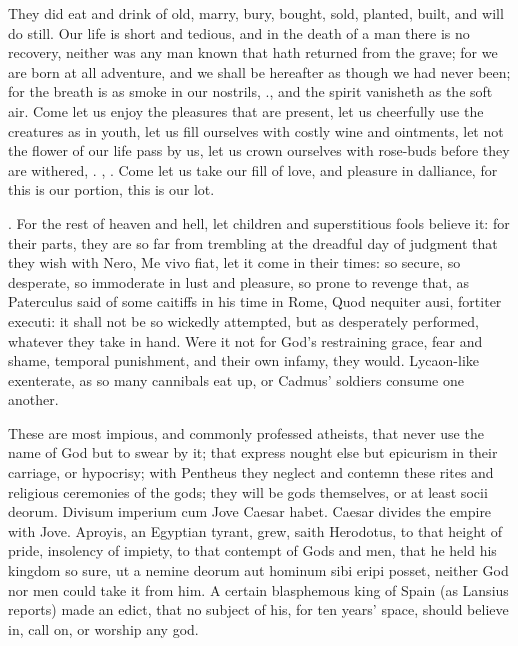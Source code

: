 {They did eat and drink of old, marry, bury, bought, sold,
planted, built, and will do still. Our life is short and tedious,
and in the death of a man there is no recovery, neither was any man
known that hath returned from the grave; for we are born at all
adventure, and we shall be hereafter as though we had never been; for
the breath is as smoke in our nostrils, \etc{}., and the spirit vanisheth
as the soft air. Come let us enjoy the pleasures that are
present, let us cheerfully use the creatures as in youth, let us fill
ourselves with costly wine and ointments, let not the flower of our
life pass by us, let us crown ourselves with rose-buds before they are
withered, \etc{}. , \etc{}.  Come let
us take our fill of love, and pleasure in dalliance, for this is our
portion, this is our lot.

. For the rest of
heaven and hell, let children and superstitious fools believe it: for
their parts, they are so far from trembling at the dreadful day of
judgment that they wish with Nero, Me vivo fiat, let it come in their
times: so secure, so desperate, so immoderate in lust and pleasure, so
prone to revenge that, as Paterculus said of some caitiffs in his time
in Rome, Quod nequiter ausi, fortiter executi: it shall not be so
wickedly attempted, but as desperately performed, whatever they take in
hand. Were it not for God's restraining grace, fear and shame, temporal
punishment, and their own infamy, they would. Lycaon-like exenterate,
as so many cannibals eat up, or Cadmus' soldiers consume one another.

These are most impious, and commonly professed atheists, that never use
the name of God but to swear by it; that express nought else but
epicurism in their carriage, or hypocrisy; with Pentheus they neglect
and contemn these rites and religious ceremonies of the gods; they will
be gods themselves, or at least socii deorum. Divisum imperium cum Jove
Caesar habet. Caesar divides the empire with Jove. Aproyis, an Egyptian
tyrant, grew, saith Herodotus, to that height of pride, insolency
of impiety, to that contempt of Gods and men, that he held his kingdom
so sure, ut a nemine deorum aut hominum sibi eripi posset, neither God
nor men could take it from him. A certain blasphemous king of
Spain (as Lansius reports) made an edict, that no subject of his,
for ten years' space, should believe in, call on, or worship any god.

}
